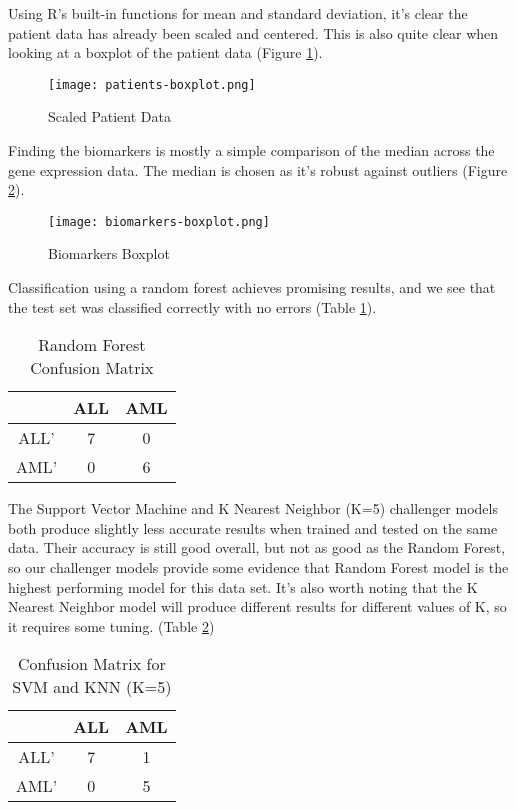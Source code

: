 \documentclass{article}
\begin{document}
Using R's built-in functions for mean and standard deviation, it's
clear the patient data has already been scaled and centered. This is
also quite clear when looking at a boxplot of the patient data
(Figure \ref{fig:patient-boxplot}).

\begin{figure}
  \texttt{[image: patients-boxplot.png]}
  \caption{Scaled Patient Data}
  \label{fig:patient-boxplot}
\end{figure}

Finding the biomarkers is mostly a simple comparison of the median
across the gene expression data. The median is chosen as it's robust
against outliers (Figure \ref{fig:biomarkers-boxplot}).

\begin{figure}
  \texttt{[image: biomarkers-boxplot.png]}
  \caption{Biomarkers Boxplot}
  \label{fig:biomarkers-boxplot}
\end{figure}

Classification using a random forest achieves promising results, and
we see that the test set was classified correctly with no errors
(Table \ref{table:1}).

\begin{table}
  \begin{center}
    \begin{tabular}{ |c|c|c| }
      \hline
      & ALL & AML \\
      \hline
      ALL' & 7 & 0 \\
      \hline
      AML' & 0 & 6 \\
      \hline
    \end{tabular}
    \caption{Random Forest Confusion Matrix}
    \label{table:1}
  \end{center}
\end{table}

The Support Vector Machine and K Nearest Neighbor (K=5) challenger
models both produce slightly less accurate results when trained and
tested on the same data.  Their accuracy is still good overall, but
not as good as the Random Forest, so our challenger models provide
some evidence that Random Forest model is the highest performing model
for this data set.  It's also worth noting that the K Nearest Neighbor
model will produce different results for different values of K, so it
requires some tuning. (Table \ref{table:2})

\begin{table}
  \begin{center}
    \begin{tabular}{ |c|c|c| }
      \hline
      & ALL & AML \\
      \hline
      ALL' & 7 & 1 \\
      \hline
      AML' & 0 & 5 \\
      \hline
    \end{tabular}
    \caption{Confusion Matrix for SVM and KNN (K=5)}
    \label{table:2}
  \end{center}
\end{table}
\end{document}
